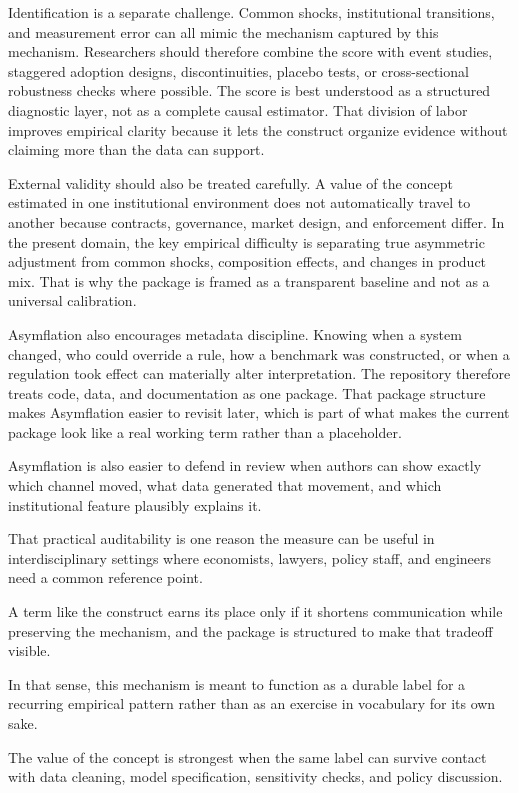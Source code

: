 \documentclass[12pt]{article}
\begin{document}
Identification is a separate challenge. Common shocks, institutional transitions, and measurement error can all mimic the mechanism captured by this mechanism. Researchers should therefore combine the score with event studies, staggered adoption designs, discontinuities, placebo tests, or cross-sectional robustness checks where possible. The score is best understood as a structured diagnostic layer, not as a complete causal estimator. That division of labor improves empirical clarity because it lets the construct organize evidence without claiming more than the data can support.

External validity should also be treated carefully. A value of the concept estimated in one institutional environment does not automatically travel to another because contracts, governance, market design, and enforcement differ. In the present domain, the key empirical difficulty is separating true asymmetric adjustment from common shocks, composition effects, and changes in product mix. That is why the package is framed as a transparent baseline and not as a universal calibration.

Asymflation also encourages metadata discipline. Knowing when a system changed, who could override a rule, how a benchmark was constructed, or when a regulation took effect can materially alter interpretation. The repository therefore treats code, data, and documentation as one package. That package structure makes Asymflation easier to revisit later, which is part of what makes the current package look like a real working term rather than a placeholder.

Asymflation is also easier to defend in review when authors can show exactly which channel moved, what data generated that movement, and which institutional feature plausibly explains it.

That practical auditability is one reason the measure can be useful in interdisciplinary settings where economists, lawyers, policy staff, and engineers need a common reference point.

A term like the construct earns its place only if it shortens communication while preserving the mechanism, and the package is structured to make that tradeoff visible.

In that sense, this mechanism is meant to function as a durable label for a recurring empirical pattern rather than as an exercise in vocabulary for its own sake.

The value of the concept is strongest when the same label can survive contact with data cleaning, model specification, sensitivity checks, and policy discussion.
\end{document}
